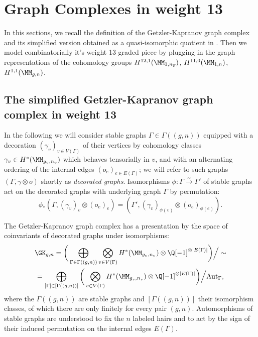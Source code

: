 

\section{Graph Complexes in weight 13}

In this sections, we recall the definition of the Getzler-Kapranov graph complex and its simplified version obtained as a quasi-isomorphic quotient in \cite{CLPW2}. Then we model combinatorially it's weight 13 graded piece by plugging in the graph representations of the cohomology groups $H^{12,1}(\MM_{1,n_{\overline{v}}})$, $H^{11,0}(\MM_{1,n})$, $H^{1,1}(\MM_{g,n})$.

\subsection{The simplified Getzler-Kapranov graph complex in weight 13}
In the following we will consider stable graphs $\Gamma\in\Gamma((g,n))$ equipped with a decoration $(\gamma_v)_{v\in V(\Gamma)}$ of their vertices by cohomology classes $\gamma_v \in H^{*}(\MM_{g_v,n_v})$ which behaves tensorially in $v$, and with an alternating ordering of the internal edges $(o_e)_{e\in E(\Gamma)}$; we will refer to such graphs $(\Gamma,\gamma\otimes o)$ shortly as \emph{decorated graphs}. Isomorphisms $\phi:\Gamma\xrightarrow{\sim}\Gamma'$ of stable graphs act on the decorated graphs with underlying graph $\Gamma$ by permutation:
\[ \phi_* (\Gamma,(\gamma_v)_{v}\otimes (o_e)_{e}) = (\Gamma',(\gamma_v)_{\phi(v)}\otimes (o_e)_{\phi(e)}). \]

The Getzler-Kapranov graph complex has a presentation by the space of coinvariants of decorated graphs under isomorphisms:
\begin{multline}\label{equ:GKdef}
    \GK_{g,n} = 
    \bigg( \bigoplus_{\Gamma\in\Gamma((g,n))} \bigotimes_{v\in V(\Gamma)}H^{*}(\MM_{g_v,n_v})\otimes \Q[-1]^{\otimes |E(\Gamma)|} \bigg) \Big/ \sim \\
    = \bigoplus_{[\Gamma]\in[\Gamma((g,n))]} \bigg(
    \bigotimes_{v\in V(\Gamma)}H^{*}(\MM_{g_v,n_v})\otimes \Q[-1]^{\otimes |E(\Gamma)|} \bigg) \Big/ \text{Aut}_{\Gamma},
\end{multline}
where the $\Gamma((g,n))$ are stable graphs and $[\Gamma((g,n))]$ their isomorphism classes, of which there are only finitely for every pair $(g,n)$. Automorphisms of stable graphs are understood to fix the $n$ labeled hairs and to act by the sign of their induced permutation on the internal edges $E(\Gamma)$.

